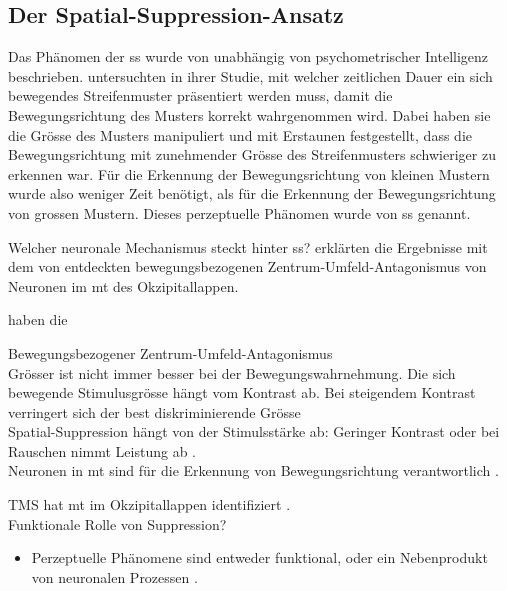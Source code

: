 \documentclass[11pt, twoside, a4paper]{book}		%
\begin{document}
\subsection{Der Spatial-Suppression-Ansatz}

Das Phänomen der \gls{ss} wurde von \citet{Tadin2003} unabhängig von psychometrischer Intelligenz beschrieben. \citeauthor{Tadin2003} untersuchten in ihrer Studie, mit welcher zeitlichen Dauer ein sich bewegendes Streifenmuster präsentiert werden muss, damit die Bewegungsrichtung des Musters korrekt wahrgenommen wird. Dabei haben sie die Grösse des Musters manipuliert und mit Erstaunen festgestellt, dass die Bewegungsrichtung mit zunehmender Grösse des Streifenmusters schwieriger zu erkennen war. Für die Erkennung der Bewegungsrichtung von kleinen Mustern wurde also weniger Zeit benötigt, als für die Erkennung der Bewegungsrichtung von grossen Mustern. Dieses perzeptuelle Phänomen wurde von \citeauthor{Tadin2003} \gls{ss} genannt.

Welcher neuronale Mechanismus steckt hinter \gls{ss}? \citet{Tadin2003} erklärten die Ergebnisse mit dem von \citet{Allman1985a} entdeckten bewegungsbezogenen Zentrum-Umfeld-Antagonismus von Neuronen im \gls{mt} des Okzipitallappen.





\citet{Melnick2013} haben die 



Bewegungsbezogener Zentrum-Umfeld-Antagonismus \citep{Allman1985a}\\

Grösser ist nicht immer besser bei der Bewegungswahrnehmung. Die sich bewegende Stimulusgrösse hängt vom Kontrast ab. Bei steigendem Kontrast verringert sich der best diskriminierende Grösse \citep{Tadin2005a}\\

Spatial-Suppression hängt von der Stimulsstärke ab: Geringer Kontrast oder bei Rauschen nimmt Leistung ab \citep{Tadin2003}.\\

Neuronen in \gls{mt} sind für die Erkennung von Bewegungsrichtung verantwortlich \citep{Dubner1971}.

TMS hat \gls{mt} im Okzipitallappen identifiziert \citep{Tadin2011}.\\

Funktionale Rolle von Suppression?
\begin{itemize}
	\item Perzeptuelle Phänomene sind entweder funktional, oder ein Nebenprodukt von neuronalen Prozessen \citep[Color-after-effect; siehe][]{Eagleman2001}.
\end{itemize}
\end{document}
